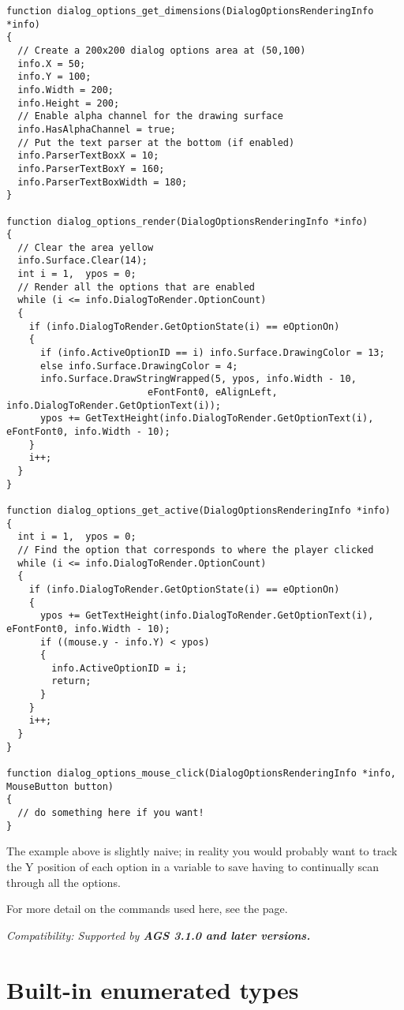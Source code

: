 \begin{verbatim}
function dialog_options_get_dimensions(DialogOptionsRenderingInfo *info)
{
  // Create a 200x200 dialog options area at (50,100)
  info.X = 50;
  info.Y = 100;
  info.Width = 200;
  info.Height = 200;
  // Enable alpha channel for the drawing surface
  info.HasAlphaChannel = true;
  // Put the text parser at the bottom (if enabled)
  info.ParserTextBoxX = 10;
  info.ParserTextBoxY = 160;
  info.ParserTextBoxWidth = 180;
}

function dialog_options_render(DialogOptionsRenderingInfo *info)
{
  // Clear the area yellow
  info.Surface.Clear(14);
  int i = 1,  ypos = 0;
  // Render all the options that are enabled
  while (i <= info.DialogToRender.OptionCount)
  {
    if (info.DialogToRender.GetOptionState(i) == eOptionOn)
    {
      if (info.ActiveOptionID == i) info.Surface.DrawingColor = 13;
      else info.Surface.DrawingColor = 4;
      info.Surface.DrawStringWrapped(5, ypos, info.Width - 10,
                         eFontFont0, eAlignLeft, info.DialogToRender.GetOptionText(i));
      ypos += GetTextHeight(info.DialogToRender.GetOptionText(i), eFontFont0, info.Width - 10);
    }
    i++;
  }
}

function dialog_options_get_active(DialogOptionsRenderingInfo *info)
{
  int i = 1,  ypos = 0;
  // Find the option that corresponds to where the player clicked
  while (i <= info.DialogToRender.OptionCount)
  {
    if (info.DialogToRender.GetOptionState(i) == eOptionOn)
    {
      ypos += GetTextHeight(info.DialogToRender.GetOptionText(i), eFontFont0, info.Width - 10);
      if ((mouse.y - info.Y) < ypos)
      {
        info.ActiveOptionID = i;
        return;
      }
    }
    i++;
  }
}

function dialog_options_mouse_click(DialogOptionsRenderingInfo *info, MouseButton button)
{
  // do something here if you want!
}
\end{verbatim}
The example above is slightly naive; in reality you would probably want to track
the Y position of each option in a variable to save having to continually scan through
all the options.

For more detail on the commands used here, see the 
page.

\it{Compatibility:} Supported by \bf{AGS 3.1.0} and later versions.



\section{Built-in enumerated types}\label{BuiltInEnums}%

